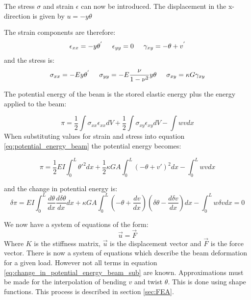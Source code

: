 \documentclass[]{report}
\begin{document}
 
The stress $\sigma$ and strain $\epsilon$ can now be introduced. The displacement in the x-direction is given by $u = -y \theta$
 
 The strain components are therefore: 
 \begin{equation}
\epsilon_{xx} = -y \theta ^{'}
\hspace{5 mm}
\epsilon_{yy} = 0
\label{eq:strain}
\hspace{5 mm}
\gamma_{xy} = -\theta + v^{'}
 \end{equation}
 and the stress is:
  \begin{equation}
 \sigma_{xx} = -E y \theta ^{'}
 \hspace{5 mm}
 \sigma_{yy} = -E \frac{\nu}{1 - \nu ^2} y \theta
 \label{eq:stress}
 \hspace{5 mm}
 \sigma_{xy} = \kappa G \gamma_{xy}
 \end{equation}
 
 The potential energy of the beam is the stored elastic energy plus the energy applied to the beam:
 
 \begin{equation}
 \pi = \frac{1}{2} \int \sigma_{xx} \epsilon_{xx} dV + \frac{1}{2} \int \sigma_{xy} \epsilon_{xy} dV  - \int w v dx
 \label{eq:potential_energy_beam}
 \end{equation}
 When substituting values for strain and stress into equation \ref{eq:potential_energy_beam} the potential energy becomes:
 
  
 \begin{equation}
 \pi = \frac{1}{2} E I  \int_{0}^{L} {\theta '}^2 dx + \frac{1}{2} \kappa G A  \int_{0}^{L} (-\theta + v')^2  dx  -  \int_{0}^{L} w v dx
 \label{eq:potential_energy_beam_sub}
 \end{equation}
 
 and the change in potential energy is:
  \begin{equation}
 \delta \pi =  E I  \int_{0}^{L} \frac{d{\theta}}{dx} \frac{d\delta {\theta}}{dx}dx +  \kappa G A  \int_{0}^{L} (-\theta + \frac{dv}{dx})(\delta \theta - \frac{d \delta v}{dx})  dx  -  \int_{0}^{L} w \delta v dx = 0
 \label{eq:change_in_potential_energy_beam_sub}
 \end{equation}
 
 We now have a system of equations of the form:
 \begin{equation}
 [K]\vec{u} = \vec{F}
 \end{equation}
 Where $K$ is the stiffness matrix, $\vec{u}$ is the displacement vector and $\vec{F}$ is the force vector. There is now a system of equations which describe the beam deformation for a given load. However not all terms in equation \ref{eq:change_in_potential_energy_beam_sub} are known. Approximations must be made for the interpolation of bending $v$ and twist $\theta$. This is done using shape functions. This process is described in section \ref{sec:FEA}.
 
\end{document}
